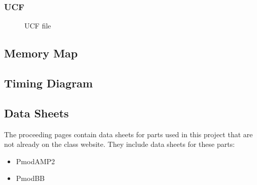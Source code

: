 \documentclass{article}
\begin{document}
      \newpage
	   	\subsubsection{UCF}
        \begin{figure}[H]
          \caption{UCF file}
          
        \end{figure}

    \newpage
  	\subsection{Memory Map}



	\subsection{Timing Diagram}



  	\subsection{Data Sheets}

  	The proceeding pages contain data sheets for parts used in this project that are not already on the class website. They include data sheets for these parts:

	\begin{itemize}
		\item PmodAMP2
		\item PmodBB
    \end{itemize}  	
\end{document}
